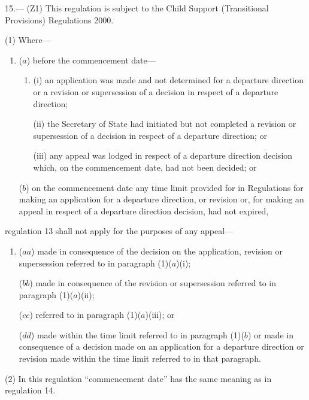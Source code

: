 \documentclass[12pt,a4paper]{article}
\begin{document}
\medskip

15.---%
(Z1) This regulation is subject to the Child Support (Transitional Provisions) Regulations 2000.

(1)  Where—
\begin{enumerate}\item[]
($a$) before the commencement date—
\begin{enumerate}\item[]
(i) an application was made and not determined for a departure direction or a revision or supersession of a decision in respect of a departure direction;

(ii) the Secretary of State had initiated but not completed a revision or supersession of a decision in respect of a departure direction; or

(iii) any appeal was lodged in respect of a departure direction decision which, on the commencement date, had not been decided; or
\end{enumerate}

($b$) on the commencement date any time limit provided for in Regulations for making an application for a departure direction, or revision or, for making an appeal in respect of a departure direction decision, had not expired,
\end{enumerate}
regulation 13 shall not apply for the purposes of any appeal—
\begin{enumerate}\item[]
($aa$) made in consequence of the decision on the application, revision or supersession referred to in paragraph (1)($a$)(i);

($bb$) made in consequence of the revision or supersession referred to in paragraph (1)($a$)(ii);

($cc$) referred to in paragraph (1)($a$)(iii); or

($dd$) made within the time limit referred to in paragraph (1)($b$)  or made in consequence of a decision made on an application for a departure direction or revision made within the time limit referred to in that paragraph.
\end{enumerate}

(2) In this regulation “commencement date” has the same meaning as in regulation 14. 

\end{document}
